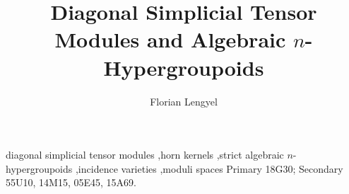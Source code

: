 \documentclass[preprint,12pt]{elsarticle}
\begin{document}
\begin{frontmatter}

\title{Diagonal Simplicial Tensor Modules and Algebraic \texorpdfstring{$n$}{n}-Hypergroupoids}

\author[cuny]{Florian Lengyel}



\begin{keyword}
diagonal simplicial tensor modules \sep horn kernels \sep strict algebraic $n$-hypergroupoids \sep incidence varieties \sep moduli spaces
\smallskip
\MSC[2020] Primary 18G30; Secondary 55U10, 14M15, 05E45, 15A69.
\end{keyword}

\end{frontmatter}











\appendix




\end{document}
